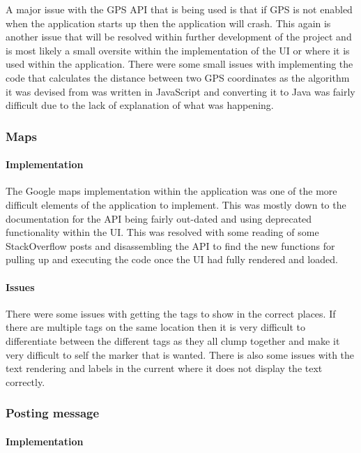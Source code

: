 A major issue with the GPS API that is being used is that if GPS is not enabled when the application starts up then the application will crash. This again is another issue that will be resolved within further development of the project and is most likely a small oversite within the implementation of the UI or where it is used within the application. There were some small issues with implementing the code that calculates the distance between two GPS coordinates as the algorithm it was devised from was written in JavaScript and converting it to Java was fairly difficult due to the lack of explanation of what was happening.


\subsubsection*{Maps}

\paragraph*{Implementation}

The Google maps implementation within the application was one of the more difficult elements of the application to implement. This was mostly down to the documentation for the API being fairly out-dated and using deprecated functionality within the UI. This was resolved with some reading of some StackOverflow posts and disassembling the API to find the new functions for pulling up and executing the code once the UI had fully rendered and loaded. 

\paragraph*{Issues}

There were some issues with getting the tags to show in the correct places. If there are multiple tags on the same location then it is very difficult to differentiate between the different tags as they all clump together and make it very difficult to self the marker that is wanted. There is also some issues with the text rendering and labels in the current where it does not display the text correctly.


\subsubsection*{Posting message}

\paragraph*{Implementation}

